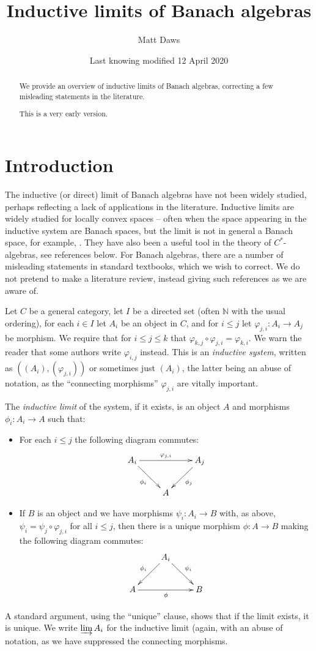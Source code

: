 \documentclass[a4paper,11pt]{article}
\title{Inductive limits of Banach algebras}
\author{Matt Daws}
\date{Last knowing modified 12 April 2020}
\newcommand{\indlim}{\varinjlim}
\theoremstyle{definition}
\begin{document}
\maketitle

\begin{abstract}
We provide an overview of inductive limits of Banach algebras, correcting a few misleading
statements in the literature.

This is a very early version.
\end{abstract}

\section{Introduction}

The inductive (or direct) limit of Banach algebras have not been widely studied, perhaps reflecting
a lack of applications in the literature.  Inductive limits are widely studied for locally convex
spaces -- often when the space appearing in the inductive system are Banach spaces, but the limit is
not in general a Banach space, for example, \cite[Chapter~IV, Section~5]{conway}.  They have also
been a useful tool in the theory of $C^*$-algebras, see references below.  For Banach algebras,
there are a number of misleading statements in standard textbooks, which we wish to correct.  We do
not pretend to make a literature review, instead giving such references as we are aware of.

Let $C$ be a general category, let $I$ be a directed set (often $\mathbb N$ with the usual
ordering), for each $i\in I$ let $A_i$ be an object in $C$, and for $i\leq j$ let $\varphi_{j,i}:
A_i\rightarrow A_j$ be morphism.  We require that for $i\leq j\leq k$ that $\varphi_{k,j} \circ
\varphi_{j,i} = \varphi_{k,i}$.  We warn the reader that some authors write $\varphi_{i,j}$
instead.  This is an \emph{inductive system}, written as $((A_i), (\varphi_{j,i}))$ or sometimes
just $(A_i)$, the latter being an abuse of notation, as the ``connecting morphisms'' $\varphi_{j,i}$
are vitally important.

The \emph{inductive limit} of the system, if it exists, is an object $A$ and morphisms $\phi_i:
A_i\rightarrow A$ such that:
\begin{itemize}
\item For each $i\leq j$ the following diagram commutes:
\[ \xymatrix{ A_i \ar[rr]^-{\varphi_{j,i}} \ar[rd]_{\phi_i} && A_j \ar[ld]^{\phi_j} \\
& A
} \]
\item If $B$ is an object and we have morphisms $\psi_i:A_i\rightarrow B$ with, as above,
$\psi_i = \psi_j \circ \varphi_{j,i}$ for all $i\leq j$, then there is a unique morphism
$\phi:A\rightarrow B$ making the following diagram commutes:
\[ \xymatrix{ & A_i \ar[ld]_{\phi_i} \ar[rd]^{\psi_i} \\
A \ar[rr]_{\phi} && B
} \]
\end{itemize}
A standard argument, using the ``unique'' clause, shows that if the limit exists, it is unique.
We write $\indlim A_i$ for the inductive limit (again, with an abuse of notation, as we have
suppressed the connecting morphisms.
\end{document}
